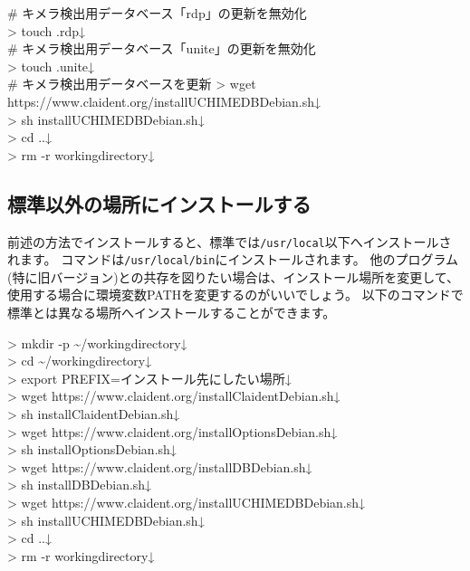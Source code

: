 \documentclass[titlepage,10pt,a4paper]{jsbook}
\newenvironment{cmd}{\begin{oframed}\raggedright\ttfamily\footnotesize\setlength{\baselineskip}{1.4em}}{\end{oframed}\vspace{-1em}}
\begin{document}
\begin{cmd}
\# キメラ検出用データベース「rdp」の更新を無効化\\
{\textgreater} touch .rdp↓\\
\# キメラ検出用データベース「unite」の更新を無効化\\
{\textgreater} touch .unite↓\\
\# キメラ検出用データベースを更新
{\textgreater} wget https://www.claident.org/installUCHIMEDB{\textunderscore}Debian.sh↓\\
{\textgreater} sh installUCHIMEDB{\textunderscore}Debian.sh↓\\
{\textgreater} cd ..↓\\
{\textgreater} rm -r workingdirectory↓
\end{cmd}

\subsection{標準以外の場所にインストールする}

前述の方法でインストールすると、標準では\texttt{/usr/local}以下へインストールされます。
コマンドは\texttt{/usr/local/bin}にインストールされます。
他のプログラム(特に旧バージョン)との共存を図りたい場合は、インストール場所を変更して、使用する場合に環境変数PATHを変更するのがいいでしょう。
以下のコマンドで標準とは異なる場所へインストールすることができます。

\begin{cmd}
{\textgreater} mkdir -p {\textasciitilde}/workingdirectory↓\\
{\textgreater} cd {\textasciitilde}/workingdirectory↓\\
{\textgreater} export PREFIX=インストール先にしたい場所↓\\
{\textgreater} wget https://www.claident.org/installClaident{\textunderscore}Debian.sh↓\\
{\textgreater} sh installClaident{\textunderscore}Debian.sh↓\\
{\textgreater} wget https://www.claident.org/installOptions{\textunderscore}Debian.sh↓\\
{\textgreater} sh installOptions{\textunderscore}Debian.sh↓\\
{\textgreater} wget https://www.claident.org/installDB{\textunderscore}Debian.sh↓\\
{\textgreater} sh installDB{\textunderscore}Debian.sh↓\\
{\textgreater} wget https://www.claident.org/installUCHIMEDB{\textunderscore}Debian.sh↓\\
{\textgreater} sh installUCHIMEDB{\textunderscore}Debian.sh↓\\
{\textgreater} cd ..↓\\
{\textgreater} rm -r workingdirectory↓
\end{cmd}
\end{document}
